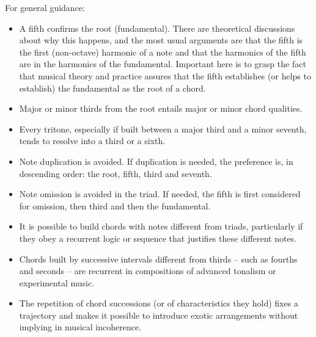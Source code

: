 \documentclass[format=acmsmall, review=false, screen=true]{acmart}
\begin{document}
For general guidance:
\begin{itemize}
        \item A fifth confirms the root (fundamental).
		There are theoretical discussions about why this happens, and the most usual arguments are that the fifth is the first (non-octave) harmonic of a note and that the harmonics of the fifth are in the harmonics of the fundamental.
                Important here is to grasp the fact that musical theory and practice assures that the fifth establishes (or helps to establish) the fundamental as the root of a chord.
        \item Major or minor thirds from the root entails major or minor chord qualities.
        \item Every tritone, especially if built between a major third and a minor seventh, tends to resolve into a third or a sixth.
        \item Note duplication is avoided. If duplication is needed, the preference is, in descending order: the root, fifth, third and seventh.
        \item Note omission is avoided in the triad. If needed, the fifth is first considered for omission, then third and then the fundamental.
        \item It is possible to build chords with notes different from triads, particularly if they obey a recurrent logic or sequence that justifies these different notes.
        \item Chords built by successive intervals different from thirds -- such as fourths and seconds -- are recurrent in compositions of advanced tonalism or experimental music.
        \item The repetition of chord successions (or of characteristics they hold) fixes a trajectory and makes it possible to 
introduce exotic arrangements without implying in musical incoherence.
\end{itemize}
\end{document}

